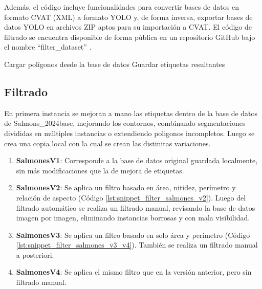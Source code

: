 Además, el código incluye funcionalidades para convertir bases de datos en formato CVAT (XML) a formato YOLO y, de forma inversa, exportar bases de datos YOLO en archivos ZIP aptos para su importación a CVAT. El código de filtrado se encuentra disponible de forma pública en un repositorio GitHub bajo el nombre \enquote{filter\_dataset} \cite{Lopez2025-Filter}.

\begin{algorithm}[H]
  \DontPrintSemicolon
  \SetAlgoLined
  Cargar polígonos desde la base de datos\;
  Guardar etiquetas resultantes\;
  \caption[Algoritmo para filtrado de base de datos]{Algoritmo para filtrado de base de datos.}
  \label{alg:filter_dataset}
\end{algorithm}

\subsection{Filtrado}
En primera instancia se mejoran a mano las etiquetas dentro de la base de datos de Salmons_2024base, mejorando los contornos, combinando segmentaciones divididas en múltiples instancias o extendiendo poligonos incompletos. Luego se crea una copia local con la cual se crean las distinitas variaciones.
\begin{enumerate}%
  \setlength{\itemsep}{0pt}%
  \setlength{\parskip}{0pt}%
  \setlength{\parsep}{0pt}%
  \item \textbf{SalmonesV1}: Corresponde a la base de datos original guardada localmente, sin más modificaciones que la de mejora de etiquetas.
  \item \textbf{SalmonesV2}: Se aplica un filtro basado en área, nitidez, perímetro y relación de aspecto (Código \ref{lst:snippet_filter_salmones_v2}). Luego del filtrado automático se realiza un filtrado manual, revisando la base de datos imagen por imagen, eliminando instancias borrosas y con mala visibilidad.
  \item \textbf{SalmonesV3}: Se aplica un filtro basado en solo área y perímetro (Código \ref{lst:snippet_filter_salmones_v3_v4}). También se realiza un filtrado manual a posteriori.
  \item \textbf{SalmonesV4}: Se aplica el mismo filtro que en la versión anterior, pero sin filtrado manual.
\end{enumerate}

